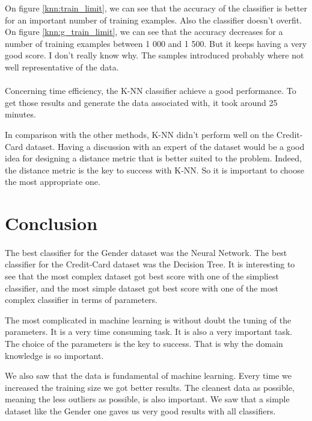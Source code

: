 \documentclass[10pt]{article}
\begin{document}
			On figure \ref{knn:train_limit}, we can see that the accuracy of the classifier is better for an important number of training examples. Also the classifier doesn't overfit. On figure \ref{knn:g_train_limit}, we can see that the accuracy decreases for a number of training examples between 1 000 and 1 500. But it keeps having a very good score. I don't really know why. The samples introduced probably where not well representative of the data.

		\paragraph*{}
			Concerning time efficiency, the K-NN classifier achieve a good performance. To get those results and generate the data associated with, it took around 25 minutes.

			In comparison with the other methods, K-NN didn't  perform well on the Credit-Card dataset. Having a discussion with an expert of the dataset would be a good idea for designing a distance metric that is better suited to the problem. Indeed, the distance metric is the key to success with K-NN. So it is important to choose the most appropriate one.
	\section{Conclusion}
		\paragraph*{}
			The best classifier for the Gender dataset was the Neural Network. The best classifier for the Credit-Card dataset was the Decision Tree. It is interesting to see that the most complex dataset got best score with one of the simpliest classifier, and the most simple dataset got best score with one of the most complex classifier in terms of parameters.

			The most complicated in machine learning is without doubt the tuning of the parameters. It is a very time consuming task. It is also a very important task. The choice of the parameters is the key to success. That is why the domain knowledge is so important.

			We also saw that the data is fundamental of machine learning. Every time we increased the training size we got better results. The cleanest data as possible, meaning the less outliers as possible, is also important. We saw that a simple dataset like the Gender one gaves us very good results with all classifiers.
\end{document}
